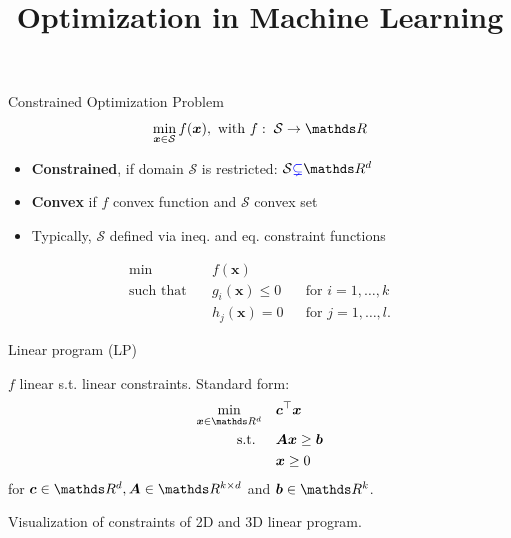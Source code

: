 \documentclass[11pt,compress,t,notes=noshow, xcolor=table]{beamer}
\title{Optimization in Machine Learning}
\begin{document}


\begin{framev}{Constrained Optimization Problem}
$$
\min_{\xv \in \mathcal{S}} \fx, \text{ with } f: \; \mathcal{S} \to \R
$$
\begin{itemize}
\item \textbf{Constrained}, if domain $\mathcal{S}$ is restricted: $\mathcal{S} \textcolor{blue}{\subsetneq} \R^d$
\item \textbf{Convex} if $f$ convex function and $\mathcal{S}$ convex set
\item Typically, $\mathcal{S}$ defined via ineq. and eq. constraint functions
\end{itemize}
\spacer
$$
\begin{aligned}
\min \quad & f(\mathbf{x})  \\
\text{such that} \quad & g_i(\mathbf{x}) \le 0 && \text{for } i=1,\ldots,k \\
& h_j(\mathbf{x}) = 0 && \text{for } j=1,\ldots,l.
\end{aligned}
$$
\end{framev}

\begin{framei}{Linear program (LP)}
\item $f$ linear s.t. linear constraints. Standard form:
$$
\begin{aligned}
\min_{\xv \in \R^d} \quad & \bm{c}^\top \xv \\
\text{s.t. } \quad & \bm{A}\xv \ge \bm{b} \\
& \xv \ge 0
\end{aligned}
$$
for $\bm{c}\in \R^d, \bm{A} \in \R^{k \times d}$ and $\bm{b} \in \R^k$.
\begin{center}\begin{footnotesize}
Visualization of constraints of 2D and 3D linear program.
\end{footnotesize}\end{center}
\end{framei}
\end{document}
